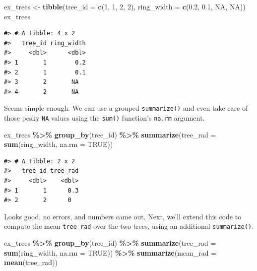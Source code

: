 \documentclass[
  11pt,
]{krantz}
\newenvironment{Shaded}{\begin{snugshade}}{\end{snugshade}}
\newcommand{\DataTypeTok}[1]{\textcolor[rgb]{0.13,0.29,0.53}{#1}}
\newcommand{\DecValTok}[1]{\textcolor[rgb]{0.00,0.00,0.81}{#1}}
\newcommand{\FloatTok}[1]{\textcolor[rgb]{0.00,0.00,0.81}{#1}}
\newcommand{\KeywordTok}[1]{\textcolor[rgb]{0.13,0.29,0.53}{\textbf{#1}}}
\newcommand{\NormalTok}[1]{#1}
\newcommand{\OperatorTok}[1]{\textcolor[rgb]{0.81,0.36,0.00}{\textbf{#1}}}
\newcommand{\OtherTok}[1]{\textcolor[rgb]{0.56,0.35,0.01}{#1}}
\newcommand{\StringTok}[1]{\textcolor[rgb]{0.31,0.60,0.02}{#1}}
\theoremstyle{definition}
\theoremstyle{definition}
\theoremstyle{definition}
\theoremstyle{definition}
\theoremstyle{remark}
\begin{document}
\begin{Shaded}
\begin{Highlighting}[]
\NormalTok{ex\_trees \textless{}{-}}\StringTok{ }\KeywordTok{tibble}\NormalTok{(}\DataTypeTok{tree\_id =} \KeywordTok{c}\NormalTok{(}\DecValTok{1}\NormalTok{, }\DecValTok{1}\NormalTok{, }\DecValTok{2}\NormalTok{, }\DecValTok{2}\NormalTok{), }
                   \DataTypeTok{ring\_width =} \KeywordTok{c}\NormalTok{(}\FloatTok{0.2}\NormalTok{, }\FloatTok{0.1}\NormalTok{, }\OtherTok{NA}\NormalTok{, }\OtherTok{NA}\NormalTok{))}
\NormalTok{ex\_trees}
\end{Highlighting}
\end{Shaded}

\begin{verbatim}
#> # A tibble: 4 x 2
#>   tree_id ring_width
#>     <dbl>      <dbl>
#> 1       1        0.2
#> 2       1        0.1
#> 3       2       NA  
#> 4       2       NA
\end{verbatim}

Seems simple enough. We can use a grouped \texttt{summarize()} and even take care of those pesky \texttt{NA} values using the \texttt{sum()} function's \texttt{na.rm} argument.

\begin{Shaded}
\begin{Highlighting}[]
\NormalTok{ex\_trees }\OperatorTok{\%\textgreater{}\%}\StringTok{ }\KeywordTok{group\_by}\NormalTok{(tree\_id) }\OperatorTok{\%\textgreater{}\%}\StringTok{ }
\StringTok{  }\KeywordTok{summarize}\NormalTok{(}\DataTypeTok{tree\_rad =} \KeywordTok{sum}\NormalTok{(ring\_width, }\DataTypeTok{na.rm =} \OtherTok{TRUE}\NormalTok{))}
\end{Highlighting}
\end{Shaded}

\begin{verbatim}
#> # A tibble: 2 x 2
#>   tree_id tree_rad
#>     <dbl>    <dbl>
#> 1       1      0.3
#> 2       2      0
\end{verbatim}

Looks good, no errors, and numbers came out. Next, we'll extend this code to compute the mean \texttt{tree\_rad} over the two trees, using an additional \texttt{summarize()}.

\begin{Shaded}
\begin{Highlighting}[]
\NormalTok{ex\_trees }\OperatorTok{\%\textgreater{}\%}\StringTok{ }\KeywordTok{group\_by}\NormalTok{(tree\_id) }\OperatorTok{\%\textgreater{}\%}\StringTok{ }
\StringTok{  }\KeywordTok{summarize}\NormalTok{(}\DataTypeTok{tree\_rad =} \KeywordTok{sum}\NormalTok{(ring\_width, }\DataTypeTok{na.rm =} \OtherTok{TRUE}\NormalTok{)) }\OperatorTok{\%\textgreater{}\%}
\StringTok{  }\KeywordTok{summarize}\NormalTok{(}\DataTypeTok{mean\_rad =} \KeywordTok{mean}\NormalTok{(tree\_rad))}
\end{Highlighting}
\end{Shaded}
\end{document}
